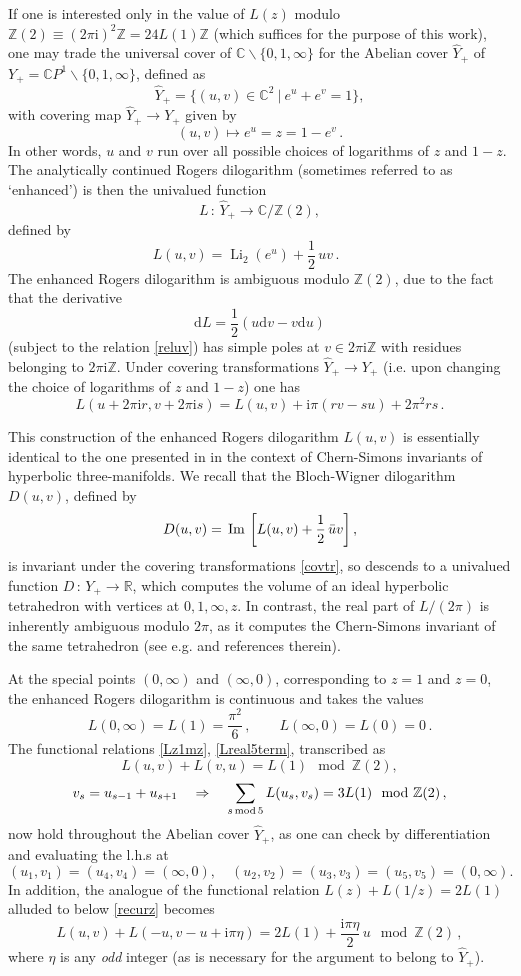 \documentclass[12pt,reqno]{article}
\numberwithin{equation}{section}
\DeclareMathOperator{\Li}{Li}
\renewcommand{\Im}{\imag}
\DeclareMathOperator{\imag}{Im}
\newcommand{\be}{\begin{equation}}
\newcommand{\ee}{\end{equation}}
\def\Im{\,{\rm Im}\, }
\def\({\left(}
\def\){\right)}
\def\hf{\frac{1}{2}}
\newcommand{\CP}{\IC P^1}
\newcommand{\de}{\mathrm{d}}
\newcommand{\I}{\mathrm{i}}
\newcommand{\IR}{\mathbb{R}}
\newcommand{\IC}{\mathbb{C}}
\newcommand{\IZ}{\mathbb{Z}}
\def\ind{s}
\numberwithin{equation}{section}
\begin{document}
If one is interested only in the value of $L(z)$ modulo $\IZ(2)\equiv (2\pi\I)^2\IZ=24L(1)\IZ$ (which
suffices for the purpose of this work),
one may trade the universal cover of $\IC\backslash\{0,1,\infty\}$ for the
Abelian cover $\hat Y_+$ of $Y_+=\CP\backslash\{0,1,\infty\}$, defined as
\be
\label{reluv}
\hat Y_+ = \{ (u,v)\in\IC^2 \ \vert \ e^u + e^v=1\} ,
\ee
with covering map $\hat Y_+\to Y_+$ given by
\be
(u,v)\mapsto e^u=z=1-e^v\, .
\ee
In other words,  $u$ and $v$ run over all possible choices of logarithms of $z$ and $1-z$.
The analytically continued Rogers dilogarithm (sometimes referred to as `enhanced')
is then the univalued
function
\be
L\, :\, \hat Y_+\to \IC/\IZ(2),
\ee
 defined by
\be
L(u,v) = \Li_2(e^u) + \frac12\, u v\, .
\qquad
\ee
The enhanced Rogers dilogarithm is ambiguous modulo $\IZ(2)$,  due to the fact that the derivative
\be
\label{eqdL}
\de L = \hf\(u \de v - v \de u\)
\ee
(subject to the relation \eqref{reluv})
has simple poles at $v\in 2\pi \I \IZ$ with residues belonging to $2\pi \I \IZ$.
Under covering transformations $\hat Y_+\to Y_+$ (i.e. upon changing the choice
of logarithms of $z$ and $1-z$) one has
\be
\label{covtr}
L(u+2\pi\I r,v+2\pi\I s) = L(u,v) + \I\pi(rv-s u)+2\pi^2 r s\, .
\ee

This construction of the enhanced Rogers dilogarithm $L(u,v)$ is essentially identical
to the one presented in \cite{MR2033484,MR2350461} in the context of Chern-Simons
invariants of hyperbolic three-manifolds.
We recall that the Bloch-Wigner dilogarithm $D(u,v) $, defined by
\be
D(u,v) = \Im \left[L(u,v) +\frac12\, \bar u v\right],
\ee
is invariant under the covering transformations \eqref{covtr},
so descends to a univalued function $D\, :\, Y_+\to \IR$,
which computes the volume of an ideal hyperbolic tetrahedron with vertices at
$0,1,\infty,z$. In contrast, the real part of $L/(2\pi)$ is
inherently ambiguous modulo
$2\pi$, as it computes the Chern-Simons invariant of the same
tetrahedron (see e.g. \cite{MR2033484} and references therein).

At the special points $(0,\infty)$ and $(\infty,0)$, corresponding to $z=1$ and $z=0$,
the enhanced Rogers dilogarithm is continuous and takes the values
\be
L(0,\infty)=L(1)=\frac{\pi^2}{6}\, ,
\qquad
L(\infty,0)=L(0)=0\, .
\ee
The functional relations \eqref{Lz1mz}, \eqref{Lreal5term}, transcribed as
\be
\label{Luvvu}
L(u,v)+L(v,u)= L(1) \mod \IZ(2),
\ee
\be
\label{Luv5term}
v_\ind = u_{\ind-1} + u_{\ind+1}\quad \Rightarrow\quad
\sum_{\ind\, {\rm mod}\, 5} L(u_\ind,v_\ind) =
3L(1) \mod \IZ(2)\, ,
\ee
now hold throughout the Abelian cover $\hat Y_+$, as one can check by differentiation
and evaluating the l.h.s at
\be
(u_1,v_1)= (u_4,v_4)=(\infty,0),\quad (u_2,v_2)= (u_3,v_3)=
(u_5,v_5)=(0,\infty).
\ee
In addition, the analogue of the functional relation $L(z)+L(1/z)=2L(1)$ alluded
to below \eqref{recurz} becomes
\be
L(u,v)+L(-u,v-u+\I\pi\eta) = 2L(1) + \frac{\I\pi\eta}{2}\, u \mod \IZ(2)\, ,
\label{LinvLuv}
\ee
where $\eta$ is any {\it odd} integer (as is necessary for the argument to belong
to $\hat Y_+$).
\end{document}
